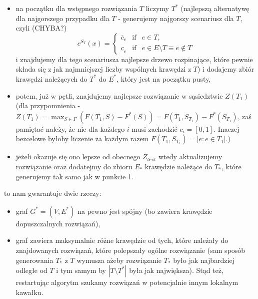 \begin{itemize}
	\item na początku dla wstępnego rozwiązania $T$ liczymy $T^{\ast}$ (najlepszą alternatywę dla najgorszego przypadku dla $T$ - generujemy najgorszy scenariusz dla $T$, czyli (CHYBA?)
	\begin{equation}
	c^{S_{T}} \left( x \right) =
	\left\{\begin{matrix}
	\overline{c}_{e}	&	\textrm{if}	&	e \in T, \\ 
	\underline{c}_{e}	&	\textrm{if}	&	e \in E \setminus T \equiv e \notin T
	\end{matrix}\right.
	\end{equation}
	i znajdujemy dla tego scenariusza najlepsze drzewo rozpinające, które pewnie składa się z jak najmniejszej liczby wspólnych krawędzi z $T$) i dodajemy zbiór krawędzi należących do $T^{\ast}$ do $E^{\ast}$, który jest na początku pusty,
	\item potem, już w pętli, znajdujemy najlepsze rozwiązanie w sąsiedztwie $Z \left( T_{1} \right)$ (dla przypomnienia - $Z \left( T_{1} \right) = \max_{S \in \Gamma} \left( F \left( T_{1}, S \right) - F^{\ast} \left( S \right) \right) = F \left( T_{1}, S_{T_{1}} \right) - F^{\ast} \left( S_{T_{1}} \right)$, zaś pamiętać należy, że  nie dla każdego $i$ musi zachodzić $c_{i} = \left[ 0, 1 \right]$. Inaczej bezcelowe byłoby liczenie za każdym razem $F \left( T_{1}, S_{T_{1}} \right) = \left| e : e \in T_{1} \right|$.)
	\item jeżeli okazuje się ono lepsze od obecnego $Z_{best}$ wtedy aktualizujemy rozwiązanie oraz dodatejmy do zbioru $E_{\ast}$ krawędzie należące do $T_{\ast}$, które generujemy tak samo jak w punkcie 1.
\end{itemize}

to nam gwarantuje dwie rzeczy:

\begin{itemize}
	\item graf $G^{\ast} = \left( V, E^{\ast} \right)$ na pewno jest spójny (bo zawiera krawędzie dopuszczalnych rozwiązań),
	\item graf zawiera maksymalnie różne krawędzie od tych, które należały do znajdowanych rozwiązań, które polepszały ogólne rozwiązanie (sam sposób generowania $T_{\ast}$ z $T$ wymusza ażeby rozwiązanie $T_{\ast}$ było jak najbardziej odległe od $T$ i tym samym by $\left| T \setminus T^{\ast} \right|$ była jak największa). Stąd też, restartując algorytm szukamy rozwiązań w potencjalnie innym lokalnym kawałku.
\end{itemize}

